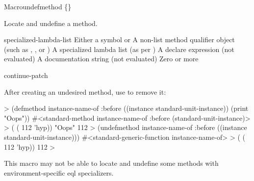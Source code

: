 \documentclass[10pt,twoside,english,pdftex]{article}
\begin{document}
\begin{functiondoc}{Macro}{undefmethod}{
    \{\}\superstar{}  
    \superstar}
%
%
%
  
\fnsyntax

\fnpurpose Locate and undefine a method.

\fnpackage {}

\fnmodule {}

\fnargs
\begin{args}{specialized-lambda-list}
 Either a symbol or 
 A non-list method qualifier object (such as
, , or )
 A specialized lambda list (as per
) 
\arg[declarations] A declare expression (not evaluated)
\arg[documentation] A documentation string (not evaluated)
\arg[forms] Zero or more 
\end{args}

\begin{alsos}{continue-patch}
\also[patch]
\end{alsos}

\fnexample
{}%
%
After creating an undesired method, use  to remove it:
%
\W\supp
\begin{example}
  > (defmethod instance-name-of :before ((instance standard-unit-instance))
       (print "Oops"))
  #<standard-method instance-name-of :before (standard-unit-instance)>
  > ( ( 112 'hyp))
  "Oops" 
  112
  > (undefmethod instance-name-of :before ((instance standard-unit-instance)))
  #<standard-generic-function instance-name-of>
  > ( ( 112 'hyp))
  112
  >
\end{example}

\fnnote This macro may not be able to locate and undefine some methods with
environment-specific eql specializers.

\end{functiondoc}
\end{document}
